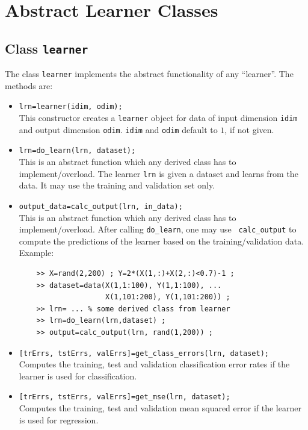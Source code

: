 \documentclass{article}
\begin{document}
\section{Abstract Learner Classes}
\subsection{Class {\tt learner}}

The class {\tt learner} implements the abstract functionality of any
``learner''. The methods are:
\begin{itemize}
\item {\tt lrn=learner(idim, odim);}\\
  This constructor creates a {\tt learner} object for data of input dimension
  {\tt idim} and output dimension {\tt odim}. {\tt idim} and {\tt odim}
  default to $1$, if not given. 
\item {\tt lrn=do\_learn(lrn, dataset);}\\
  This is an abstract function which any derived class has to
  implement/overload. The learner {\tt lrn} is given a dataset and learns from
  the data. It may use the training and validation set only.
\item {\tt output\_data=calc\_output(lrn, in\_data);}\\
  This is an abstract function which any derived class has to
  implement/overload. After calling {\tt do\_learn}, one may use {\tt
    calc\_output} to compute the predictions of the learner based on the
  training/validation data.\\
  Example:
  \begin{verbatim}
    >> X=rand(2,200) ; Y=2*(X(1,:)+X(2,:)<0.7)-1 ;
    >> dataset=data(X(1,1:100), Y(1,1:100), ...
                    X(1,101:200), Y(1,101:200)) ;
    >> lrn= ... % some derived class from learner
    >> lrn=do_learn(lrn,dataset) ;
    >> output=calc_output(lrn, rand(1,200)) ;
  \end{verbatim}
  \vspace*{-5mm}
\item {\tt [trErrs, tstErrs, valErrs]=get\_class\_errors(lrn, dataset);}\\
  Computes the training, test and validation classification error rates if the
  learner is used for classification.
\item {\tt [trErrs, tstErrs, valErrs]=get\_mse(lrn, dataset);}\\
  Computes the training, test and validation mean squared error if the learner
  is used for regression.
\end{itemize}
\end{document}
